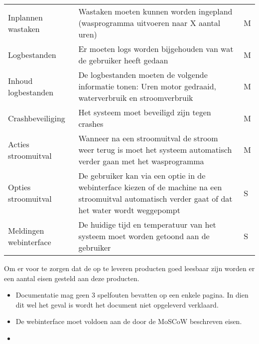 \begin{longtable}{ p{3cm} p{7cm} l }
Inplannen wastaken & Wastaken moeten kunnen worden ingepland (wasprogramma uitvoeren naar X aantal uren) & M \\
Logbestanden & Er moeten logs worden bijgehouden van wat de gebruiker heeft gedaan & M \\
Inhoud logbestanden & De logbestanden moeten de volgende informatie tonen: Uren motor gedraaid, waterverbruik en stroomverbruik & M \\
Crashbeveiliging & Het systeem moet beveiligd zijn tegen crashes & M \\
Acties stroomuitval & Wanneer na een stroomuitval de stroom weer terug is moet het systeem automatisch verder gaan met het wasprogramma & M \\
Opties stroomuitval & De gebruiker kan via een optie in de webinterface kiezen of de machine na een stroomuitval automatisch verder gaat of dat het water wordt weggepompt & S \\
Meldingen webinterface & De huidige tijd en temperatuur van het systeem moet worden getoond aan de gebruiker & S \\
\end{longtable}



\subtitle{Kwaliteitseisen op te leveren producten}
Om er voor te zorgen dat de op te leveren producten goed leesbaar zijn worden er een aantal eisen gesteld aan deze producten.

\begin{itemize}
	\item Documentatie mag geen 3 spelfouten bevatten op een enkele pagina. In dien dit wel het geval is wordt het document niet opgeleverd verklaard.
	\item De webinterface moet voldoen aan de door de MoSCoW beschreven eisen.
	\item 
\end{itemize}
